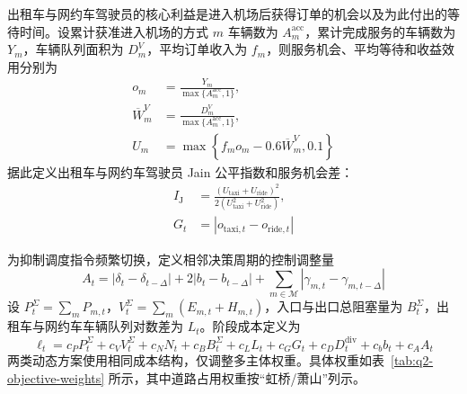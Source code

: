 \documentclass[UTF8,a4paper,11pt,onecolumn,fontset=none]{ctexart}
\begin{document}
出租车与网约车驾驶员的核心利益是进入机场后获得订单的机会以及为此付出的等待时间。设累计获准进入机场的方式 $m$ 车辆数为 $A_m^{\mathrm{acc}}$，累计完成服务的车辆数为 $Y_m$，车辆队列面积为 $D_m^V$，平均订单收入为 $f_m$，则服务机会、平均等待和收益效用分别为
\begin{align}
  o_m
  &=\frac{Y_m}{\max\{A_m^{\mathrm{acc}},1\}},
  \label{eq:q2-service-opportunity}\\
  \overline W_m^V
  &=\frac{D_m^V}{\max\{A_m^{\mathrm{acc}},1\}},
  \label{eq:q2-driver-wait}\\
  U_m
  &=\max\left\{
  f_m o_m-0.6\overline W_m^V,
  0.1
  \right\}
  \label{eq:q2-driver-utility}
\end{align}
据此定义出租车与网约车驾驶员 Jain 公平指数和服务机会差：
\begin{align}
  I_{\mathrm J}
  &=\frac{\left(U_{\mathrm{taxi}}+U_{\mathrm{ride}}\right)^2}
  {2\left(U_{\mathrm{taxi}}^2+U_{\mathrm{ride}}^2\right)},
  \label{eq:q2-jain-index}\\
  G_t
  &=\left|o_{\mathrm{taxi},t}-o_{\mathrm{ride},t}\right|
  \label{eq:q2-opportunity-gap}
\end{align}

为抑制调度指令频繁切换，定义相邻决策周期的控制调整量
\begin{equation}
  A_t=
  |\delta_t-\delta_{t-\Delta}|
  +2|b_t-b_{t-\Delta}|
  +\sum_{m\in\mathcal M}
  |\gamma_{m,t}-\gamma_{m,t-\Delta}|
  \label{eq:q2-control-adjustment}
\end{equation}
设 $P_t^\Sigma=\sum_mP_{m,t}$，$V_t^\Sigma=\sum_m(E_{m,t}+H_{m,t})$，入口与出口总阻塞量为 $B_t^\Sigma$，出租车与网约车车辆队列对数差为 $L_t$。阶段成本定义为
\begin{equation}
  \ell_t=
  c_P P_t^\Sigma+c_V V_t^\Sigma+c_NN_t+c_BB_t^\Sigma
  +c_L L_t+c_GG_t+c_DD_t^{\mathrm{div}}
  +c_bb_t+c_AA_t
  \label{eq:q2-stage-cost}
\end{equation}
两类动态方案使用相同成本结构，仅调整多主体权重。具体权重如表~\ref{tab:q2-objective-weights} 所示，其中道路占用权重按“虹桥/萧山”列示。
\end{document}
